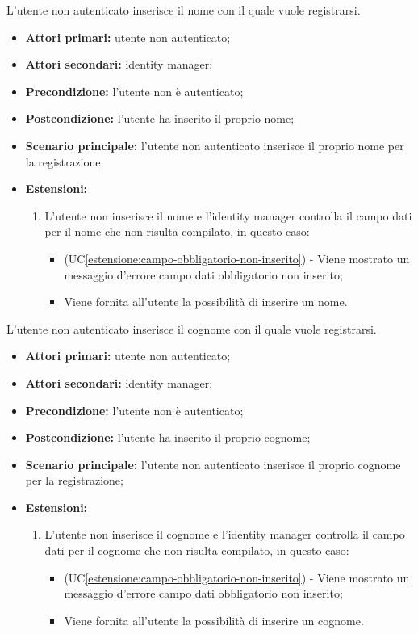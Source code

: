 \label{registrazione.modulo.nome}

L'utente non autenticato inserisce il nome con il quale vuole registrarsi.
\begin{itemize}
	\item \textbf{Attori primari:} utente non autenticato;
	\item \textbf{Attori secondari:} identity manager;
	\item \textbf{Precondizione:} l'utente non è autenticato;
	\item \textbf{Postcondizione:} l'utente ha inserito il proprio nome;
	\item \textbf{Scenario principale:} l'utente non autenticato inserisce il proprio nome per la registrazione;
	\item \textbf{Estensioni:}
	\begin{enumerate}[label=\lett]
		\item L'utente non inserisce il nome e l'identity manager controlla il campo dati per il nome che non risulta compilato, in questo caso:
		\begin{itemize}
			\item (UC\ref{estensione:campo-obbligatorio-non-inserito}) - Viene mostrato un messaggio d'errore campo dati obbligatorio non inserito;
			\item Viene fornita all'utente la possibilità di inserire un nome.
		\end{itemize}
	\end{enumerate} 
\end{itemize}

\label{registrazione.modulo.cognome}

L'utente non autenticato inserisce il cognome con il quale vuole registrarsi.
\begin{itemize}
	\item \textbf{Attori primari:} utente non autenticato;
	\item \textbf{Attori secondari:} identity manager;
	\item \textbf{Precondizione:} l'utente non è autenticato;
	\item \textbf{Postcondizione:} l'utente ha inserito il proprio cognome;
	\item \textbf{Scenario principale:} l'utente non autenticato inserisce il proprio cognome per la registrazione;
	\item \textbf{Estensioni:}
	\begin{enumerate}[label=\lett]
		\item L'utente non inserisce il cognome e l'identity manager controlla il campo dati per il cognome che non risulta compilato, in questo caso:
		\begin{itemize}
			\item (UC\ref{estensione:campo-obbligatorio-non-inserito}) - Viene mostrato un messaggio d'errore campo dati obbligatorio non inserito;
			\item Viene fornita all'utente la possibilità di inserire un cognome.
		\end{itemize}
	\end{enumerate}
\end{itemize}


